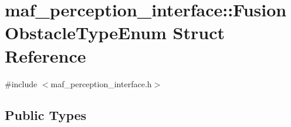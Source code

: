 \hypertarget{structmaf__perception__interface_1_1FusionObstacleTypeEnum}{}\section{maf\+\_\+perception\+\_\+interface\+:\+:Fusion\+Obstacle\+Type\+Enum Struct Reference}
\label{structmaf__perception__interface_1_1FusionObstacleTypeEnum}


{\ttfamily \#include $<$maf\+\_\+perception\+\_\+interface.\+h$>$}

\subsection*{Public Types}
